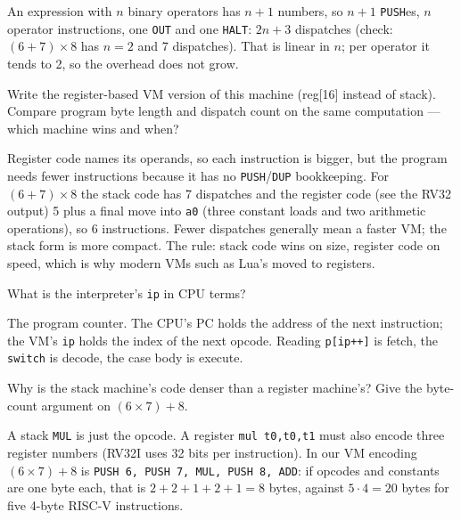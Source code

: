 \begin{solution}
An expression with $n$ binary operators has $n+1$ numbers, so
$n+1$ \texttt{PUSH}es, $n$ operator instructions, one \texttt{OUT}
and one \texttt{HALT}: $2n+3$ dispatches (check: $(6+7)\times8$ has
$n=2$ and 7 dispatches). That is linear in $n$; per operator it tends to 2, so
the overhead does not grow.
\end{solution}
\begin{exercise}[hard]
Write the register-based VM version of this machine (reg[16]
instead of stack). Compare program byte length and dispatch count
on the same computation --- which machine wins and when?
\end{exercise}
\begin{solution}
Register code names its operands, so each instruction is bigger, but the
program needs fewer instructions because it has no \texttt{PUSH}/\texttt{DUP}
bookkeeping. For $(6+7)\times8$ the stack code has 7 dispatches and the
register code (see the RV32 output) 5 plus a final move into \texttt{a0}
(three constant loads and two arithmetic operations), so 6 instructions. Fewer dispatches generally mean a faster VM; the stack form is more compact.
The rule: stack code wins on size, register code on speed, which is why
modern VMs such as Lua's moved to registers.
\end{solution}
\begin{exercise}[easy]
What is the interpreter's \texttt{ip} in CPU terms?
\end{exercise}
\begin{solution}
The program counter. The CPU's PC holds the address of the next
instruction; the VM's \texttt{ip} holds the index of the next opcode.
Reading \texttt{p[ip++]} is fetch, the \texttt{switch} is decode, the case body is execute.
\end{solution}
\begin{exercise}[medium]
Why is the stack machine's code denser than a register machine's?
Give the byte-count argument on $(6{\times}7)+8$.
\end{exercise}
\begin{solution}
A stack \texttt{MUL} is just the opcode. A register
\texttt{mul t0,t0,t1} must also encode three register numbers (RV32I uses
32 bits per instruction). In our VM encoding $(6\times7)+8$ is
\texttt{PUSH 6, PUSH 7, MUL, PUSH 8, ADD}: if opcodes and constants
are one byte each, that is $2+2+1+2+1=8$ bytes, against $5\cdot4=20$ bytes for
five 4-byte RISC-V instructions.
\end{solution}
